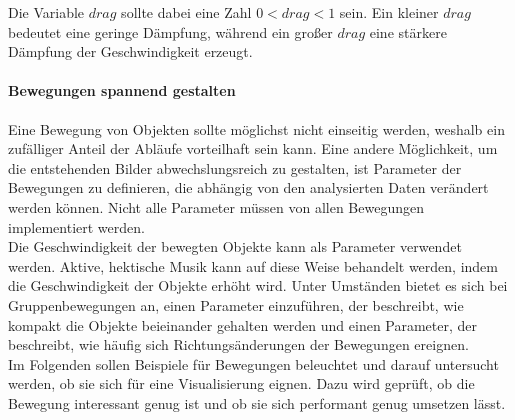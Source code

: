 \documentclass[11pt,a4paper]{article}
\begin{document}
\noindent
Die Variable $drag$ sollte dabei eine Zahl $0 < drag < 1$ sein. Ein kleiner $drag$ bedeutet eine geringe Dämpfung, während ein großer $drag$ eine stärkere Dämpfung der Geschwindigkeit erzeugt.

\paragraph{Bewegungen spannend gestalten}
Eine Bewegung von Objekten sollte möglichst nicht einseitig werden, weshalb ein zufälliger Anteil der Abläufe vorteilhaft sein kann. Eine andere Möglichkeit, um die entstehenden Bilder abwechslungsreich zu gestalten, ist Parameter der Bewegungen zu definieren, die abhängig von den analysierten Daten verändert werden können. Nicht alle Parameter müssen von allen Bewegungen implementiert werden.\\
Die Geschwindigkeit der bewegten Objekte kann als Parameter verwendet werden. Aktive, hektische Musik kann auf diese Weise behandelt werden, indem die Geschwindigkeit der Objekte erhöht wird. Unter Umständen bietet es sich bei Gruppenbewegungen an, einen Parameter einzuführen, der beschreibt, wie kompakt die Objekte beieinander gehalten werden und einen Parameter, der beschreibt, wie häufig sich Richtungsänderungen der Bewegungen ereignen.\\
Im Folgenden sollen Beispiele für Bewegungen beleuchtet und darauf untersucht werden, ob sie sich für eine Visualisierung eignen. Dazu wird geprüft, ob die Bewegung interessant genug ist und ob sie sich performant genug umsetzen lässt.\\
\end{document}
